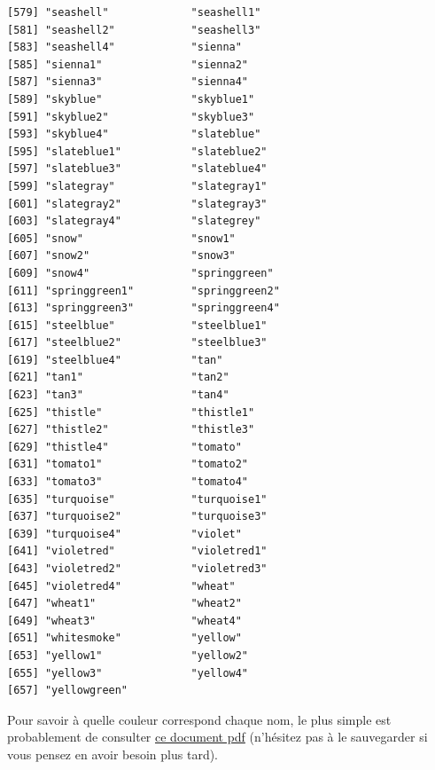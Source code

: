 \documentclass[
  a4paper,
]{article}
\begin{document}
\begin{verbatim}
[579] "seashell"             "seashell1"           
[581] "seashell2"            "seashell3"           
[583] "seashell4"            "sienna"              
[585] "sienna1"              "sienna2"             
[587] "sienna3"              "sienna4"             
[589] "skyblue"              "skyblue1"            
[591] "skyblue2"             "skyblue3"            
[593] "skyblue4"             "slateblue"           
[595] "slateblue1"           "slateblue2"          
[597] "slateblue3"           "slateblue4"          
[599] "slategray"            "slategray1"          
[601] "slategray2"           "slategray3"          
[603] "slategray4"           "slategrey"           
[605] "snow"                 "snow1"               
[607] "snow2"                "snow3"               
[609] "snow4"                "springgreen"         
[611] "springgreen1"         "springgreen2"        
[613] "springgreen3"         "springgreen4"        
[615] "steelblue"            "steelblue1"          
[617] "steelblue2"           "steelblue3"          
[619] "steelblue4"           "tan"                 
[621] "tan1"                 "tan2"                
[623] "tan3"                 "tan4"                
[625] "thistle"              "thistle1"            
[627] "thistle2"             "thistle3"            
[629] "thistle4"             "tomato"              
[631] "tomato1"              "tomato2"             
[633] "tomato3"              "tomato4"             
[635] "turquoise"            "turquoise1"          
[637] "turquoise2"           "turquoise3"          
[639] "turquoise4"           "violet"              
[641] "violetred"            "violetred1"          
[643] "violetred2"           "violetred3"          
[645] "violetred4"           "wheat"               
[647] "wheat1"               "wheat2"              
[649] "wheat3"               "wheat4"              
[651] "whitesmoke"           "yellow"              
[653] "yellow1"              "yellow2"             
[655] "yellow3"              "yellow4"             
[657] "yellowgreen"         
\end{verbatim}

Pour savoir à quelle couleur correspond chaque nom, le plus simple est probablement de consulter \href{http://www.stat.columbia.edu/~tzheng/files/Rcolor.pdf}{ce document pdf} (n'hésitez pas à le sauvegarder si vous pensez en avoir besoin plus tard).
\end{document}
